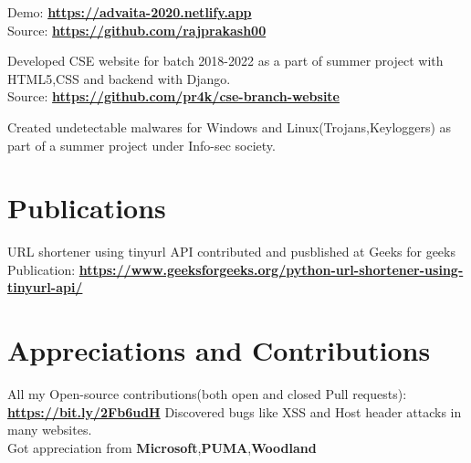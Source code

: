 \documentclass[]{deedy-resume-openfont}
\begin{document}
\begin{minipage}[t]{0.66\textwidth}
Demo: \textbf{\href{https://advaita-2020.netlify.app}{https://advaita-2020.netlify.app}}\\
Source: \textbf{\href{https://github.com/rajprakash00}{https://github.com/rajprakash00}}

\sectionsep

Developed CSE website for batch 2018-2022 as a part of summer project with HTML5,CSS and backend with Django. \\
Source: \textbf{\href{https://github.com/pr4k/cse-branch-website}{https://github.com/pr4k/cse-branch-website}}
\sectionsep

Created undetectable malwares for Windows and
Linux(Trojans,Keyloggers) as part of a summer project under Info-sec society.
\sectionsep


\section{Publications} 
URL shortener using tinyurl API contributed and pusblished at Geeks for geeks\\
Publication: \textbf{\href{https://www.geeksforgeeks.org/python-url-shortener-using-tinyurl-api/}{https://www.geeksforgeeks.org/python-url-shortener-using-tinyurl-api/}}


\section{Appreciations and Contributions}
All my Open-source contributions(both open and closed Pull requests): \textbf{\href{https://bit.ly/2Fb6udH}{https://bit.ly/2Fb6udH}}
\newline \newline
Discovered bugs like XSS and Host header attacks in many websites.\\
Got appreciation from \textbf{Microsoft},\textbf{PUMA},\textbf{Woodland}

\end{minipage} 
\end{document}

